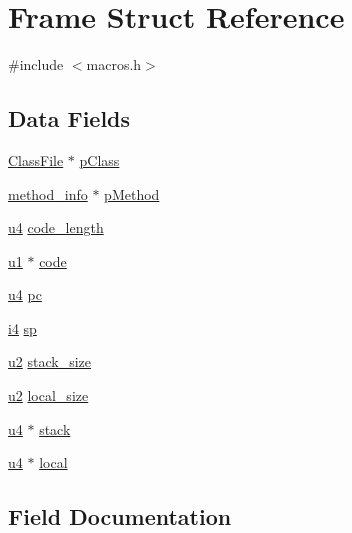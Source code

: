 \hypertarget{struct_frame}{}\section{Frame Struct Reference}
\label{struct_frame}


{\ttfamily \#include $<$macros.\+h$>$}

\subsection*{Data Fields}
\begin{DoxyCompactItemize}
\item 
\hyperlink{struct_class_file}{Class\+File} $\ast$ \hyperlink{struct_frame_a6a54d76f8d532b2c2ec63564e5cc8a54}{p\+Class}
\item 
\hyperlink{structmethod__info}{method\+\_\+info} $\ast$ \hyperlink{struct_frame_a2a145c2f4c0f3bcf0dfdc1f1e3b3861b}{p\+Method}
\item 
\hyperlink{macros_8h_ae5be1f726785414dd1b77d60df074c9d}{u4} \hyperlink{struct_frame_a67fc7666df284938e4ce4eb69bd75d10}{code\+\_\+length}
\item 
\hyperlink{macros_8h_ad9f4cdb6757615aae2fad89dab3c5470}{u1} $\ast$ \hyperlink{struct_frame_a83424ffc7afb5e85f548fa9a222cbef4}{code}
\item 
\hyperlink{macros_8h_ae5be1f726785414dd1b77d60df074c9d}{u4} \hyperlink{struct_frame_ab295ec939e1e4318ca6e7e4747f2ab56}{pc}
\item 
\hyperlink{macros_8h_a7bc084923d20fddbe46335d882c6fda2}{i4} \hyperlink{struct_frame_a16c9e46e653a3c2df6e0809e094d5fe9}{sp}
\item 
\hyperlink{macros_8h_a732cde1300aafb73b0ea6c2558a7a54f}{u2} \hyperlink{struct_frame_a9084483c0055ef44e3edca4da4910f97}{stack\+\_\+size}
\item 
\hyperlink{macros_8h_a732cde1300aafb73b0ea6c2558a7a54f}{u2} \hyperlink{struct_frame_ad93f76d3f2e35a5cddfaa5e346429771}{local\+\_\+size}
\item 
\hyperlink{macros_8h_ae5be1f726785414dd1b77d60df074c9d}{u4} $\ast$ \hyperlink{struct_frame_a7ca4d10dfc7be9e5143b39f0d85df4ed}{stack}
\item 
\hyperlink{macros_8h_ae5be1f726785414dd1b77d60df074c9d}{u4} $\ast$ \hyperlink{struct_frame_ac047b0e2a83dac503e8018b6201a0278}{local}
\end{DoxyCompactItemize}


\subsection{Field Documentation}
\hypertarget{struct_frame_a83424ffc7afb5e85f548fa9a222cbef4}{}
